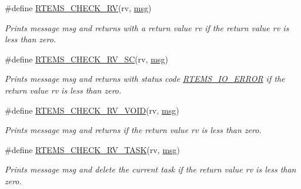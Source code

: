 \begin{DoxyCompactItemize}
\#define \mbox{\hyperlink{group__rtems__status__checks_ga53297875da9f233759947a4964f1d7dc}{R\+T\+E\+M\+S\+\_\+\+C\+H\+E\+C\+K\+\_\+\+RV}}(rv,  \mbox{\hyperlink{structmsg}{msg}})
\begin{DoxyCompactList}\small\item\em Prints message {\itshape msg} and returns with a return value {\itshape rv} if the return value {\itshape rv} is less than zero. \end{DoxyCompactList}\item 
\#define \mbox{\hyperlink{group__rtems__status__checks_ga3879a3f9bfb4e7fcc77b1d0406366b05}{R\+T\+E\+M\+S\+\_\+\+C\+H\+E\+C\+K\+\_\+\+R\+V\+\_\+\+SC}}(rv,  \mbox{\hyperlink{structmsg}{msg}})
\begin{DoxyCompactList}\small\item\em Prints message {\itshape msg} and returns with status code \mbox{\hyperlink{group__ClassicStatus_gga545d41846817eaba6143d52ee4d9e9feaafb7268b75dfdd3f4518045e52525d45}{R\+T\+E\+M\+S\+\_\+\+I\+O\+\_\+\+E\+R\+R\+OR}} if the return value {\itshape rv} is less than zero. \end{DoxyCompactList}\item 
\#define \mbox{\hyperlink{group__rtems__status__checks_ga287a280046e363c9c5efd9962cacb800}{R\+T\+E\+M\+S\+\_\+\+C\+H\+E\+C\+K\+\_\+\+R\+V\+\_\+\+V\+O\+ID}}(rv,  \mbox{\hyperlink{structmsg}{msg}})
\begin{DoxyCompactList}\small\item\em Prints message {\itshape msg} and returns if the return value {\itshape rv} is less than zero. \end{DoxyCompactList}\item 
\#define \mbox{\hyperlink{group__rtems__status__checks_gac7da49b093229fef71437cb2ff0d304c}{R\+T\+E\+M\+S\+\_\+\+C\+H\+E\+C\+K\+\_\+\+R\+V\+\_\+\+T\+A\+SK}}(rv,  \mbox{\hyperlink{structmsg}{msg}})
\begin{DoxyCompactList}\small\item\em Prints message {\itshape msg} and delete the current task if the return value {\itshape rv} is less than zero. \end{DoxyCompactList}\end{DoxyCompactItemize}
